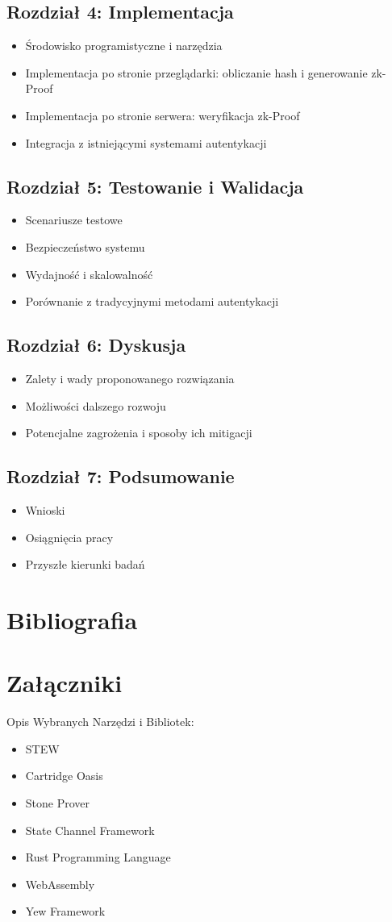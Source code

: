 \documentclass{article}
\begin{document}
\subsection{Rozdział 4: Implementacja}
\begin{itemize}
    \item Środowisko programistyczne i narzędzia
    \item Implementacja po stronie przeglądarki: obliczanie hash i generowanie zk-Proof
    \item Implementacja po stronie serwera: weryfikacja zk-Proof
    \item Integracja z istniejącymi systemami autentykacji
\end{itemize}

\subsection{Rozdział 5: Testowanie i Walidacja}
\begin{itemize}
    \item Scenariusze testowe
    \item Bezpieczeństwo systemu
    \item Wydajność i skalowalność
    \item Porównanie z tradycyjnymi metodami autentykacji
\end{itemize}

\subsection{Rozdział 6: Dyskusja}
\begin{itemize}
    \item Zalety i wady proponowanego rozwiązania
    \item Możliwości dalszego rozwoju
    \item Potencjalne zagrożenia i sposoby ich mitigacji
\end{itemize}

\subsection{Rozdział 7: Podsumowanie}
\begin{itemize}
    \item Wnioski
    \item Osiągnięcia pracy
    \item Przyszłe kierunki badań
\end{itemize}

\section*{Bibliografia}

\section*{Załączniki}
Opis Wybranych Narzędzi i Bibliotek:
\begin{itemize}
    \item STEW
    \item Cartridge Oasis
    \item Stone Prover
    \item State Channel Framework
    \item Rust Programming Language
    \item WebAssembly
    \item Yew Framework
\end{itemize}
\end{document}
